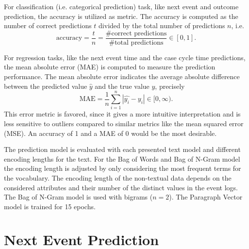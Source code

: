 For classification (i.e. categorical prediction) task, like next event and outcome prediction, the accuracy is utilized as metric.
The accuracy is computed as the number of correct predictions $t$ divided by the total number of predictions $n$, i.e. 
\begin{equation*}
	\textrm{accuracy} = \dfrac{t}{n} = \dfrac{\textrm{\# correct predictions}}{\textrm{\# total predictions}} \in [0,1].
\end{equation*}

For regression tasks, like the next event time and the case cycle time predictions, the mean absolute error (MAE) is computed to measure the prediction performance. The mean absolute error indicates the average absolute difference between the predicted value $\hat{y}$ and the true value $y$,  precisely
\begin{equation*}
	\textrm{MAE} = \dfrac{1}{n}\sum_{i=1}^{n}|\hat{y_i} - y_i| \in [0, \infty).
\end{equation*}
This error metric is favored, since it gives a more intuitive interpretation and is less sensitive to outliers compared to similar metrics like the mean squared error (MSE).
An accuracy of 1 and a MAE of 0 would be the most desirable.

The prediction model is evaluated with each presented text model and different encoding lengths for the text.
For the Bag of Words and Bag of N-Gram model the encoding length is adjusted by only considering the most frequent terms for the vocabulary.
The encoding length of the non-textual data depends on the considered attributes and their number of the distinct values in the event logs.
The Bag of N-Gram model is used with bigrams ($n=2$).
The Paragraph Vector model is trained for 15 epochs.

\section{Next Event Prediction}



